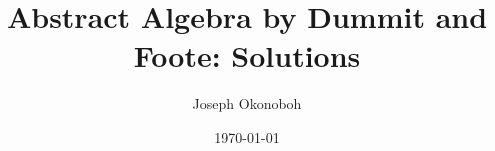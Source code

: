 \documentclass[9pt]{book}
\title{\vspace{-14cm}Abstract Algebra by Dummit and Foote: Solutions}
\author{Joseph Okonoboh}
\date{\today}
\newcommand{\Z}{\mathbb{Z}}
\begin{document}
   \maketitle
\begin{comment}   
   \tableofcontents

   \chapter{Preliminaries}
      \section{Basics}
         
      \section{Properties Of The Integers}
         
      \section{$\Z/n\Z$ : The Integers Modulo $n$}
         
         
   \part{}

   \chapter{Introduction To Groups}
      \section{Basic Axioms And Examples}
         
      \section{Dihedral Groups}
         
      \section{Symmetric Groups}
         
      \section{Matrix Groups}
         
      \section{The Quaternion Group}
         

\end{comment}
\end{document}
